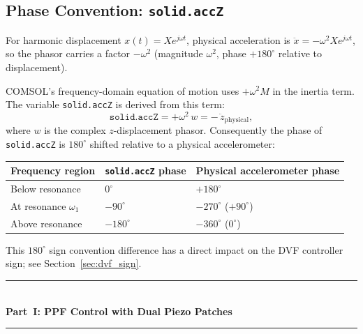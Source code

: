 \documentclass[12pt,a4paper]{article}
\begin{document}
\subsection{Phase Convention: \texttt{solid.accZ}}
\label{sec:phase}

For harmonic displacement $x(t) = X e^{j\omega t}$, physical acceleration is
$\ddot{x} = -\omega^2 X e^{j\omega t}$, so the phasor carries a factor
$-\omega^2$ (magnitude $\omega^2$, phase $+180^\circ$ relative to displacement).

COMSOL's frequency-domain equation of motion uses $+\omega^2 M$ in the inertia
term.  The variable \texttt{solid.accZ} is derived from this term:
\begin{equation}
  \texttt{solid.accZ} = +\omega^2\,w = -\,\ddot{z}_\text{physical},
  \label{eq:accZ}
\end{equation}
where $w$ is the complex $z$-displacement phasor.  Consequently the phase of
\texttt{solid.accZ} is $180^\circ$ shifted relative to a physical accelerometer:

\begin{center}
\begin{tabular}{lll}
\toprule
Frequency region & \texttt{solid.accZ} phase & Physical accelerometer phase \\
\midrule
Below resonance & $0^\circ$ & $+180^\circ$ \\
At resonance $\omega_1$ & $-90^\circ$ & $-270^\circ$ ($+90^\circ$) \\
Above resonance & $-180^\circ$ & $-360^\circ$ ($0^\circ$) \\
\bottomrule
\end{tabular}
\end{center}

This $180^\circ$ sign convention difference has a direct impact on the DVF
controller sign; see Section~\ref{sec:dvf_sign}.

\newpage
\begin{center}
  \rule{\linewidth}{1.5pt}\\[6pt]
  {\LARGE\bfseries Part~I: PPF Control with Dual Piezo Patches}\\[6pt]
  \rule{\linewidth}{1.5pt}
\end{center}
\end{document}
